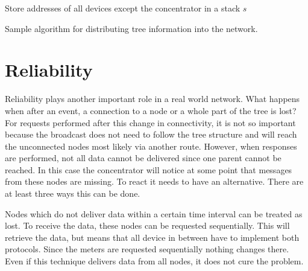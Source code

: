 \begin{algorithm}[H]
Store addresses of all devices except the concentrator in a stack $s$\;
 \caption{Sample algorithm for distributing tree information into the network.}
 \label{algo:pseudocode_1}
\end{algorithm}

\section{Reliability}
Reliability plays another important role in a real world network. What happens when after an event, a connection to a node or a whole part of the tree is lost? For requests performed after this change in connectivity, it is not so important because the broadcast does not need to follow the tree structure and will reach the unconnected nodes most likely via another route. However, when responses are performed, not all data cannot be delivered since one parent cannot be reached. In this case the concentrator will notice at some point that messages from these nodes are missing. To react it needs to have an alternative. There are at least three ways this can be done.

Nodes which do not deliver data within a certain time interval can be treated as lost. To receive the data, these nodes can be requested sequentially. This will retrieve the data, but means that all device in between have to implement both protocols. Since the meters are requested sequentially nothing changes there. Even if this technique delivers data from all nodes, it does not cure the problem.

